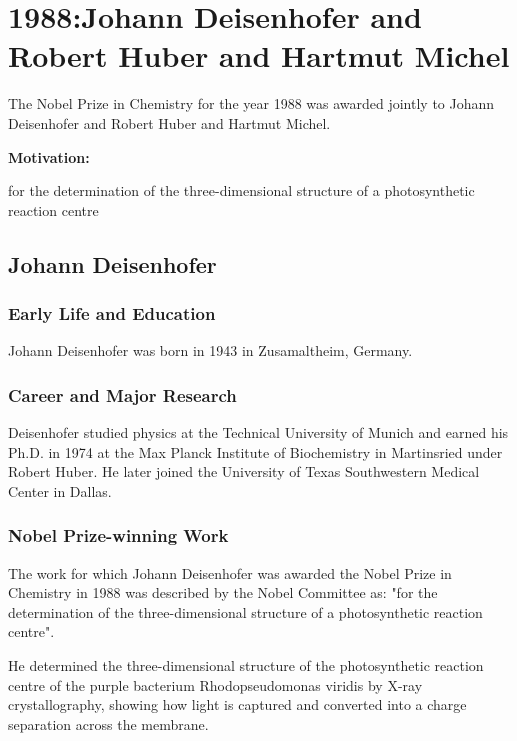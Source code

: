 \chapter{1988:Johann Deisenhofer and Robert Huber and Hartmut Michel}

\label{chap:chemistry1988}

The Nobel Prize in Chemistry for the year 1988 was awarded jointly to Johann Deisenhofer and Robert Huber and Hartmut Michel.

\textbf{Motivation:}

for the determination of the three-dimensional structure of a photosynthetic reaction centre

\section{Johann Deisenhofer}

\subsection*{Early Life and Education}

Johann Deisenhofer was born in 1943 in Zusamaltheim, Germany.

\subsection*{Career and Major Research}

Deisenhofer studied physics at the Technical University of Munich and earned his Ph.D. in 1974 at the Max Planck Institute of Biochemistry in Martinsried under Robert Huber. He later joined the University of Texas Southwestern Medical Center in Dallas.

\subsection*{Nobel Prize-winning Work}

The work for which Johann Deisenhofer was awarded the Nobel Prize in Chemistry in 1988 was described by the Nobel Committee as: "for the determination of the three-dimensional structure of a photosynthetic reaction centre".

He determined the three-dimensional structure of the photosynthetic reaction centre of the purple bacterium Rhodopseudomonas viridis by X-ray crystallography, showing how light is captured and converted into a charge separation across the membrane.

